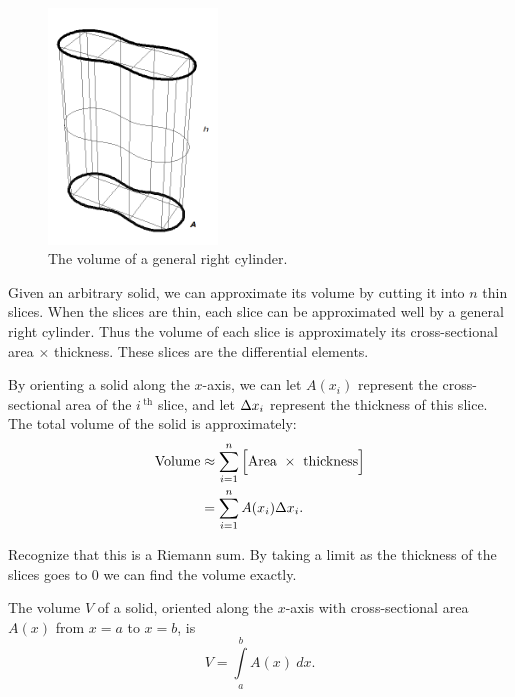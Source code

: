 \begin{figure}[h]
	\begin{center}
			\includegraphics[width=0.4\textwidth]{fig_int_app_9.png}
	\caption{The volume of a general right cylinder.}
	\label{fig_int_app_9}
	\end{center}
\end{figure}

Given an arbitrary solid, we can approximate its volume by cutting it into $n$  thin slices. When the slices are thin, each slice can be approximated well by a general right cylinder. Thus the volume of each slice is approximately its cross-sectional area $\times$ thickness. These slices are the differential elements.

By orienting a solid along the $x$-axis, we can let $A(x_i)$ represent the cross-sectional area
of the $i\,^\text{th}$ slice, and let $\Delta x_i$ represent the thickness of this slice. The total volume of the solid is approximately:
	\begin{align*} \text{Volume} &\approx \sum_{i=1}^n \Big[\text{Area}\ \times\ \text{thickness}\Big] \\
			&= \sum_{i=1}^n A(x_i)\dx_i.
	\end{align*}
	
Recognize that this is a Riemann sum. By taking a limit as the thickness of the slices goes to 0 we can find the volume exactly. 

\pagebreak
\begin{theorem}\label{thm:volume_by_cross_section}
The volume $V$ of a solid, oriented along the $x$-axis with cross-sectional area $A(x)$ from $x=a$ to $x=b$, is 
$$V = \int\limits_a^b A(x)\ dx.$$
\end{theorem}




